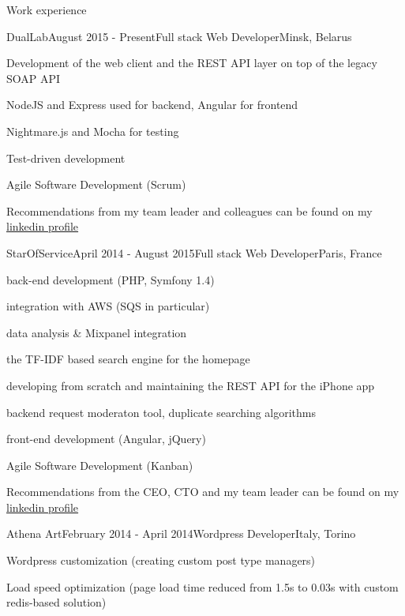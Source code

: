 \documentclass{resume} %
\begin{document}
\begin{rSection}{Work experience}

\begin{rSubsection}{DualLab}{August 2015 - Present}{Full stack Web Developer}{Minsk, Belarus}
\item Development of the web client and the REST API layer on top of the legacy SOAP API
\item NodeJS and Express used for backend, Angular for frontend
\item Nightmare.js and Mocha for testing
\item Test-driven development
\item Agile Software Development (Scrum)
\item Recommendations from my team leader and colleagues can be found on my \href{http://linkedin.com/in/mikhalchenkoa}{linkedin profile}
\end{rSubsection}

\clearpage



\begin{rSubsection}{StarOfService}{April 2014 - August 2015}{Full stack Web Developer}{Paris, France}
\item back-end development (PHP, Symfony 1.4)
\item integration with AWS (SQS in particular)
\item data analysis \& Mixpanel integration
\item the TF-IDF based search engine for the homepage
\item developing from scratch and maintaining the REST API for the iPhone app 
\item backend request moderaton tool, duplicate searching algorithms
\item front-end development (Angular, jQuery)
\item Agile Software Development (Kanban)
\item Recommendations from the CEO, CTO and my team leader can be found on my \href{http://linkedin.com/in/mikhalchenkoa}{linkedin profile}
\end{rSubsection}


\begin{rSubsection}{Athena Art}{February 2014 - April 2014}{Wordpress Developer}{Italy, Torino}
\item Wordpress customization (creating custom post type managers)
\item Load speed optimization (page load time reduced from 1.5s to 0.03s with custom redis-based solution)
\end{rSubsection}


\end{rSection}
\end{document}
